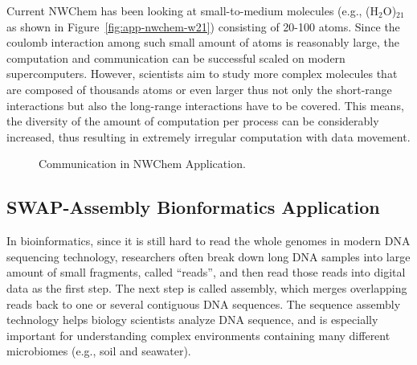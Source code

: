 Current NWChem has been looking at small-to-medium molecules (e.g.,
(H$_2$O)$_{21}$ as shown in Figure~\ref{fig:app-nwchem-w21}) consisting of
20-100 atoms. Since the coulomb interaction among such small amount of
atoms is reasonably large, the computation and communication can be
successful scaled on modern supercomputers. However, scientists aim to
study more complex molecules that are composed of thousands atoms or even
larger thus not only the short-range interactions but also the long-range
interactions have to be covered. This means, the diversity of the amount
of computation per process can be considerably increased, thus resulting
in extremely irregular computation with data movement.

\begin{figure}[ht]
\centering
{}
\caption{Communication in NWChem Application.}
\label{fig:app-nwchem}
\end{figure}


\subsection{SWAP-Assembly Bionformatics Application}

In bioinformatics, since it is still hard to read the whole genomes
in modern DNA sequencing technology, researchers often break down long
DNA samples into large amount of small fragments, called ``reads'', and
then read those reads into digital data as the first step. The next step
is called assembly, which merges overlapping reads back to one or several
contiguous DNA sequences. The sequence assembly technology helps biology
scientists analyze DNA sequence, and is especially important for understanding
complex environments containing many different microbiomes (e.g., soil and
seawater).

